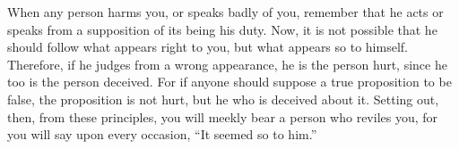 When any person harms you, or speaks badly of you, remember that
he acts or speaks from a supposition of its being his duty. Now, it
is not possible that he should follow what appears right to you, but
what appears so to himself. Therefore, if he judges from a wrong appearance,
he is the person hurt, since he too is the person deceived. For if
anyone should suppose a true proposition to be false, the proposition
is not hurt, but he who is deceived about it. Setting out, then, from
these principles, you will meekly bear a person who reviles you, for
you will say upon every occasion, ``It seemed so to him.''
